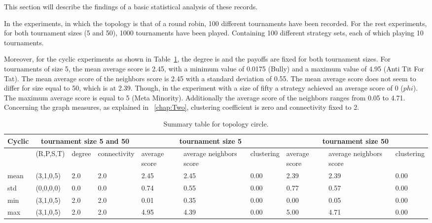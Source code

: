 This section will describe the findings of a basic statistical analysis of these
records.

In the experiments, in which the topology is that of a round robin,
100 different tournaments have been recorded.
For the rest experiments, for both tournament sizes (5 and 50),
1000 tournaments have been played. Containing 100 different strategy sets, each of
which playing 10 tournaments.

Moreover, for the cyclic experiments as shown in Table~\ref{sum-cicle}, the degree is
and the payoffs are fixed for both tournament sizes. For tournaments of size 5,
the mean average score is 2.45, with a minimum value of 0.0175 (Bully) and a maximum
value of 4.95 (Anti Tit For Tat). The mean average score of the neighbors score
is 2.45 with a standard deviation of 0.55.
The mean average score does not seem to differ for size equal to 50, which is at
2.39. Though, in the experiment with a size of fifty a strategy
achieved an average score of 0 ($phi$). The maximum average score is equal to
5 (Meta Minority). Additionally the average score of the neighbors ranges
from 0.05 to 4.71. Concerning the graph measures, as explained in ~\ref{chap:Two},
clustering coefficient is zero and connectivity fixed to 2.
\begin{table}[!hbtp]
\centering
\begin{adjustbox}{width=1\textwidth}
\small
\begin{tabular}{@{}|l|l|l|l|l|l|l|l|l|l|@{}}
\toprule
Cyclic & \multicolumn{3}{c|}{tournament size 5 and 50} & \multicolumn{3}{c|}{tournament size 5} & \multicolumn{3}{c|}{tournament size 50}                             \\\midrule

       & (R,P,S,T) & degree & connectivity & average score & average neighbors score & clustering & average score & average neighbors score & clustering \\\midrule
mean   & (3,1,0,5) & 2.0    & 2.0          & 2.45      & 2.45            & 0.00       & 2.39     & 2.39             & 0.00       \\\midrule
std    & (0,0,0,0) & 0.0    & 0.0          & 0.74      & 0.55            & 0.00       & 0.77     & 0.57             & 0.00       \\\midrule
min    & (3,1,0,5) & 2.0    & 2.0          & 0.01      & 0.35            & 0.00       & 0.00     & 0.05             & 0.00       \\\midrule
max    & (3,1,0,5) & 2.0    & 2.0          & 4.95      & 4.39            & 0.00       & 5.00     & 4.71             & 0.00       \\ \bottomrule
\end{tabular}
\end{adjustbox}
\caption{Summary table for topology circle.}
\label{sum-cicle}
\end{table}

